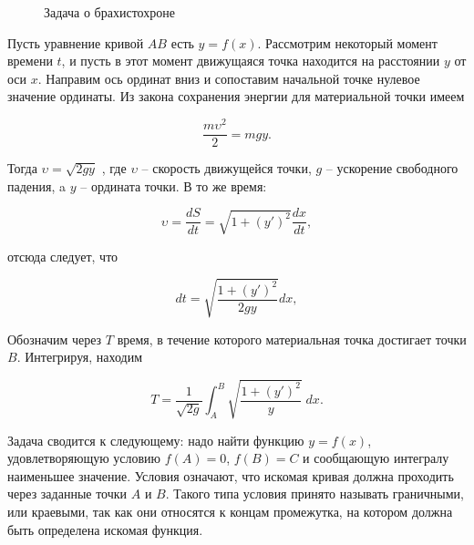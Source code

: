 \begin{figure}[!ht]
\caption{Задача о брахистохроне}
\label{img_brachistochrone}
\end{figure}

Пусть уравнение кривой $AB$ есть $y = f(x)$. Рассмотрим некоторый момент времени $t$, и пусть в этот момент движущаяся точка находится на расстоянии $y$ от оси $x$. Направим ось ординат вниз и сопоставим начальной точке нулевое значение ординаты. Из закона сохранения энергии для материальной точки имеем

\begin{displaymath}
    \frac{m\upsilon^2}{2} = mgy.
\end{displaymath}

Тогда $\upsilon = \sqrt{2gy}$ , где $\upsilon$ -- скорость движущейся точки, $g$ -- ускорение свободного падения, a $y$ -- ордината точки. В то же время:

\begin{displaymath}
    \upsilon = \frac{dS}{dt} = \sqrt{1 + (y')^2} \frac{dx}{dt},
\end{displaymath}

\noindent отсюда следует, что

\begin{displaymath}
    dt = \sqrt{\frac{1 + (y')^2}{2gy}}dx,
\end{displaymath}

\noindent Обозначим через $T$ время, в течение которого материальная точка достигает точки $B$. Интегрируя, находим

\begin{displaymath}
    T = \frac{1}{\sqrt{2g}} \int_{A}^{B} \sqrt{\frac{1 + (y')^2}{y}} \; dx.
\end{displaymath}

Задача сводится к следующему: надо найти функцию $y = f(x)$, удовлетворяющую условию $f(A) = 0$, $f(B) = C$ и сообщающую интегралу наименьшее значение. Условия означают, что искомая кривая должна проходить через заданные точки $A$ и $B$. Такого типа условия принято называть граничными, или краевыми, так как они относятся к концам промежутка, на котором должна быть определена искомая функция.


